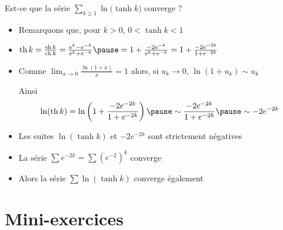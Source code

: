 \begin{frame}

\begin{exemple}
Est-ce que la série $\displaystyle\sum_{k \ge 1}  \ln \big(\tanh k\big)$ converge ?

\begin{itemize}
  \item\pause Remarquons que, pour $k >0$, $0<\tanh k<1$ 
  
  \item\pause $\tanh k = \frac{\sh k}{\ch k} = \frac{e^k-e^{-k}}{e^k+e^{-k}}
  \pause= 1+  \frac{-2e^{-k}}{e^k+e^{-k}} = 1+\frac{-2e^{-2k}}{1+e^{-2k}}$

  
  \item\pause Comme $\lim_{x\to 0} \frac{\ln(1+x)}{x}=1$ alors, si
  $u_k \to 0$, $\ln(1+u_k) \sim u_k$
  
  \pause Ainsi 
  $$\ln(\tanh k) = \ln\left( 1+\frac{-2e^{-2k}}{1+e^{-2k}} \right)
  \pause\sim  \frac{-2e^{-2k}}{1+e^{-2k}} \pause \sim -2e^{-2k}$$
      
  \item\pause Les suites $\ln(\tanh k)$ et $-2e^{-2k}$ sont strictement négatives  
  \item\pause La série $\sum e^{-2k}= \sum (e^{-2})^k$ converge
  \item\pause Alors la série $\sum\ln(\tanh k)$ converge également 
\end{itemize}

\end{exemple}
\end{frame}

\section{Mini-exercices}

